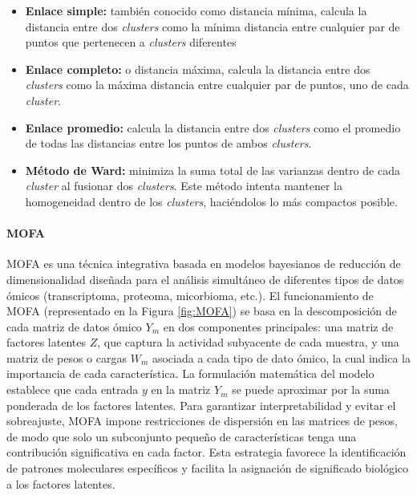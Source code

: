 \begin{itemize}
\item \textbf{Enlace simple:} también conocido como distancia mínima, calcula la distancia entre dos \textit{clusters} como la mínima distancia entre cualquier par de puntos que pertenecen a \textit{clusters} diferentes

\item \textbf{Enlace completo:} o distancia máxima, calcula la distancia entre dos \textit{clusters} como la máxima distancia entre cualquier par de puntos, uno de cada \textit{cluster}.

\item \textbf{Enlace promedio:} calcula la distancia entre dos \textit{clusters} como el promedio de todas las distancias entre los puntos de ambos \textit{clusters}.

\item \textbf{Método de Ward:} minimiza la suma total de las varianzas dentro de cada \textit{cluster} al fusionar dos \textit{clusters}. Este método intenta mantener la homogeneidad dentro de los \textit{clusters}, haciéndolos lo más compactos posible.
\end{itemize} 


\paragraph{MOFA}

MOFA es una técnica integrativa basada en modelos bayesianos de reducción de dimensionalidad diseñada para el análisis simultáneo de diferentes tipos de datos ómicos (transcriptoma, proteoma, micorbioma, etc.). El funcionamiento de MOFA (representado en la Figura \ref{fig:MOFA}) se basa en la descomposición de cada matriz de datos ómico $Y_{m}$ en dos componentes principales: una matriz de factores latentes $Z$, que captura la actividad subyacente de cada muestra, y una matriz de pesos o cargas $W_{m}$ asociada a cada tipo de dato ómico, la cual indica la importancia de cada característica. La formulación matemática del modelo establece que cada entrada $y$ en la matriz $Y_{m}$ se puede aproximar por la suma ponderada de los factores latentes. Para garantizar interpretabilidad y evitar el sobreajuste, MOFA impone restricciones de dispersión en las matrices de pesos, de modo que solo un subconjunto pequeño de características tenga una contribución significativa en cada factor. Esta estrategia favorece la identificación de patrones moleculares específicos y facilita la asignación de significado biológico a los factores latentes.

